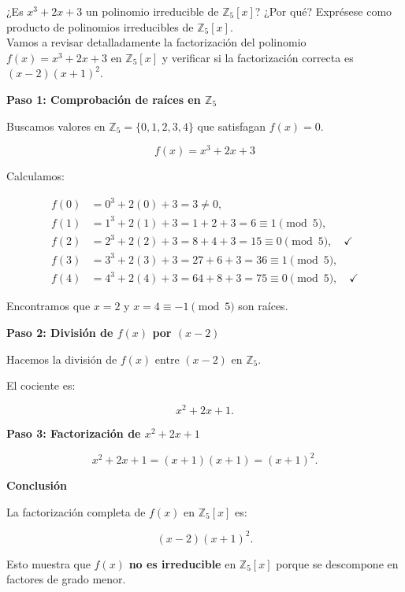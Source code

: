 ¿Es $x^3 + 2x + 3$ un polinomio irreducible de $\mathbb{Z}_5[x]$? ¿Por qué? Exprésese como producto de polinomios irreducibles de $\mathbb{Z}_5[x]$.
\noindent
\\
Vamos a revisar detalladamente la factorización del polinomio \( f(x) = x^3 + 2x + 3 \) en \( \mathbb{Z}_5[x] \) y verificar si la factorización correcta es \( (x - 2)(x + 1)^2 \).

\smallskip

\textbf{Paso 1: Comprobación de raíces en \( \mathbb{Z}_5 \)}

Buscamos valores en \( \mathbb{Z}_5 = \{0,1,2,3,4\} \) que satisfagan \( f(x) = 0 \).

\[
f(x) = x^3 + 2x + 3
\]

Calculamos:

\[
\begin{aligned}
    f(0) &= 0^3 + 2(0) + 3 = 3 \neq 0, \\
    f(1) &= 1^3 + 2(1) + 3 = 1 + 2 + 3 = 6 \equiv 1 \pmod{5}, \\
    f(2) &= 2^3 + 2(2) + 3 = 8 + 4 + 3 = 15 \equiv 0 \pmod{5}, \quad \checkmark \\
    f(3) &= 3^3 + 2(3) + 3 = 27 + 6 + 3 = 36 \equiv 1 \pmod{5}, \\
    f(4) &= 4^3 + 2(4) + 3 = 64 + 8 + 3 = 75 \equiv 0 \pmod{5}, \quad \checkmark
\end{aligned}
\]

Encontramos que \( x = 2 \) y \( x = 4 \equiv -1 \pmod{5} \) son raíces.

\smallskip

\textbf{Paso 2: División de \( f(x) \) por \( (x - 2) \)}

Hacemos la división de \( f(x) \) entre \( (x - 2) \) en \( \mathbb{Z}_5 \).

El cociente es:

\[
x^2 + 2x + 1.
\]

\smallskip

\textbf{Paso 3: Factorización de \( x^2 + 2x + 1 \)}

\[
x^2 + 2x + 1 = (x + 1)(x + 1) = (x + 1)^2.
\]

\smallskip

\textbf{Conclusión}

La factorización completa de \( f(x) \) en \( \mathbb{Z}_5[x] \) es:

\[
(x - 2)(x + 1)^2.
\]

Esto muestra que \( f(x) \) \textbf{no es irreducible} en \( \mathbb{Z}_5[x] \) porque se descompone en factores de grado menor.
